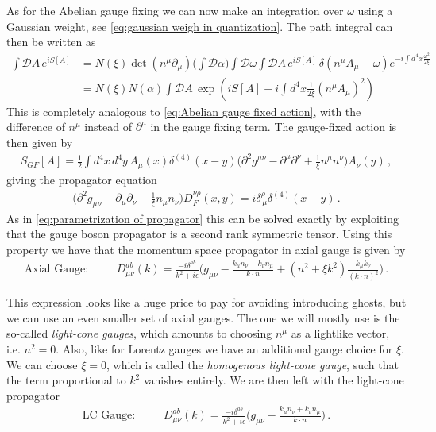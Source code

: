 As for the Abelian gauge fixing we can now make an integration over $\omega$ using a Gaussian weight, see \cref{eq:gaussian weigh in quantization}. The path integral can then be written as
\begin{align}
    \int\mathcal{D}A\,e^{iS[A]}&=N(\xi)\det(n^{\mu}\partial_{\mu})\Big(\int\mathcal{D}\alpha\Big)\int\mathcal{D}\omega\int\mathcal{D}A\,e^{iS[A]}\,\delta(n^{\mu}A_{\mu}-\omega)e^{-i\int d^{4}x\frac{\omega^{2}}{2\xi}}\nonumber
    \\
    &=N(\xi)N(\alpha)\int\mathcal{D}A\,\exp(iS[A]-i\int d^{4}x\frac{1}{2\xi}(n^{\mu}A_{\mu})^{2})
\end{align}
This is completely analogous to \cref{eq:Abelian gauge fixed action}, with the difference of $n^{\mu}$ instead of $\partial^{\mu}$ in the gauge fixing term. The gauge-fixed action is then given by
\begin{align}
    S_{GF}[A]=\frac{1}{2}\int d^{4}x\,d^{4}y\,A_{\mu}(x)\delta^{(4)}(x-y)\big(\partial^{2}g^{\mu\nu}-\partial^{\mu}\partial^{\nu}+\frac{1}{\xi}n^{\mu}n^{\nu}\big)A_{\nu}(y)\,,
\end{align}
giving the propagator equation
\begin{align}
    \big(\partial^{2}g_{\mu\nu}-\partial_{\mu}\partial_{\nu}-\frac{1}{\xi}n_{\mu}n_{\nu}\big)D_{F}^{\nu\rho}(x,y)=i\delta_{\,\mu}^{\rho}\delta^{(4)}(x-y)\,.
\end{align}
As in \cref{eq:parametrization of propagator} this can be solved exactly by exploiting that the gauge boson propagator is a second rank symmetric tensor. Using this property we have that the momentum space propagator in axial gauge is given by
\begin{align}
    \text{Axial Gauge}:\hspace{1cm}D_{\mu\nu}^{ab}(k)=\frac{-i\delta^{ab}}{k^{2}+i\epsilon}\Big(g_{\mu\nu}-\frac{k_{\mu}n_{\nu}+k_{\nu}n_{\mu}}{k\cdot n}+(n^{2}+\xi k^{2})\frac{k_{\mu}k_{\nu}}{(k\cdot n)^{2}}\Big)\,.
\end{align}

This expression looks like a huge price to pay for avoiding introducing ghosts, but we can use an even smaller set of axial gauges. The one we will mostly use is the so-called \emph{light-cone gauges}, which amounts to choosing $n^{\mu}$ as a lightlike vector, i.e. $n^{2}=0$. Also, like for Lorentz gauges we have an additional gauge choice for $\xi$. We can choose $\xi=0$, which is called the \emph{homogenous light-cone gauge}, such that the term proportional to $k
^{2}$ vanishes entirely. We are then left with the light-cone propagator
\begin{align}\label{eq:lightcone propagator}
    \text{LC Gauge}:\hspace{1cm}D_{\mu\nu}^{ab}(k)=\frac{-i\delta^{ab}}{k^{2}+i\epsilon}\Big(g_{\mu\nu}-\frac{k_{\mu}n_{\nu}+k_{\nu}n_{\mu}}{k\cdot n}\Big)\,.
\end{align}

